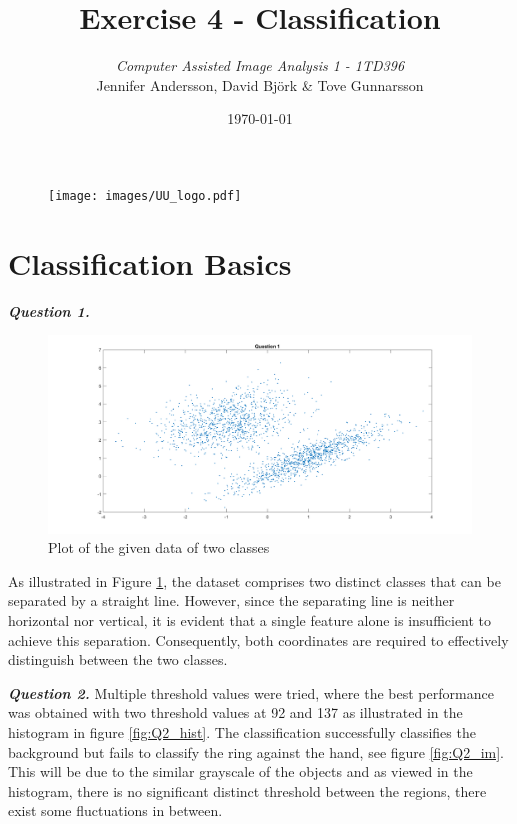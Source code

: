 \documentclass[12pt]{article}
\title{Exercise 4  - Classification}
\author{\textit{Computer Assisted Image Analysis 1  - 1TD396}  \vspace{1cm} \\
         Jennifer Andersson, David Björk \& Tove Gunnarsson \vspace{0.7cm}\\
        }
\date{\today}
\begin{document}
\maketitle

\begin{figure}[b]
  \centering
  \texttt{[image: images/UU\_logo.pdf]}
\end{figure}
\thispagestyle{empty}

\clearpage

\newpage
\section{Classification Basics}


\textbf{\emph{Question 1.}}

\begin{figure}[b]
  \centering
  \includegraphics[width = 15cm]{images/Q1.png}
  \caption{Plot of the given data of two classes}
  \label{fig:Q1}
\end{figure}

As illustrated in Figure \ref{fig:Q1}, the dataset comprises two distinct classes that can be separated by a straight line. However, since the separating line is neither horizontal nor vertical, it is evident that a single feature alone is insufficient to achieve this separation. Consequently, both coordinates are required to effectively distinguish between the two classes.

\textbf{\emph{Question 2.}}
Multiple threshold values were tried, where the best performance was obtained with two threshold values at 92 and 137 as illustrated in the histogram in figure \ref{fig:Q2_hist}. The classification successfully classifies the background but fails to classify the ring against the hand, see figure \ref{fig:Q2_im}. This will be due to the similar grayscale of the objects and as viewed in the histogram,  there is no significant distinct threshold between the regions, there exist some fluctuations in between. 
\end{document}
